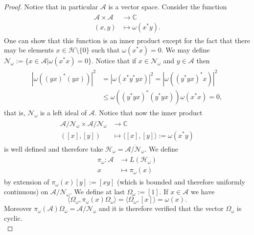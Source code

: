 \begin{proof}
Notice that in particular $\mathcal{A}$ is a vector space. Consider the function
\begin{align}
\begin{split}
\mathcal{A}\times\mathcal{A}&\rightarrow\mathbb{C} \\
(x,y)&\mapsto\omega(x^*y).
\end{split}
\end{align}
One can show that this function is an inner product except for the fact that there may be elements $x\in\mathcal{H}\setminus\{0\}$ such that $\omega(x^*x)=0$. We may define $\mathcal{N}_\omega := \{x\in\mathcal{A}|\omega(x^*x)=0\}$. Notice that if $x\in\mathcal{N}_\omega$ and $y\in\mathcal{A}$ then 
\begin{align}
\begin{split}
|\omega((yx)^*(yx))|^2&=|\omega(x^*y^*yx)|^2=|\omega((y^*yx)^*x)|^2 \\
&\leq\omega((y^*yx)^*(y^*yx))\omega(x^*x)=0,
\end{split}
\end{align}
that is, $\mathcal{N}_\omega$ is a left ideal of $\mathcal{A}$. Notice that now the inner product
\begin{align}
\begin{split}
\mathcal{A}/\mathcal{N}_\omega\times\mathcal{A}/\mathcal{N}_\omega&\rightarrow\mathbb{C} \\
([x],[y])&\mapsto\langle[x],[y]\rangle:=\omega(x^*y)
\end{split}
\end{align}
is well defined and therefore take $\mathcal{H}_\omega=\overline{\mathcal{A}/\mathcal{N}_\omega}$. We define 
\begin{align}
\begin{split}
\pi_\omega:\mathcal{A}&\rightarrow L(\mathcal{H}_\omega) \\
x&\mapsto \pi_\omega(x)
\end{split}
\end{align}
by extension of $\pi_\omega(x)[y]:=[xy]$ (which is bounded and therefore uniformly continuous) on $\mathcal{A}/\mathcal{N}_\omega$. We define at last $\Omega_\omega:=[1]$. If $x\in\mathcal{A}$ we have
\begin{equation}\label{eqn:state_representation}
\langle \Omega_\omega, \pi_\omega(x)\Omega_\omega\rangle = \langle \Omega_\omega, [x]\rangle = \omega(x). 
\end{equation}
Moreover $\pi_\omega(\mathcal{A})\Omega_\omega = \mathcal{A}/\mathcal{N}_\omega$ and it is therefore verified that the vector $\Omega_\omega$ is cyclic. \\ 

\end{proof}
